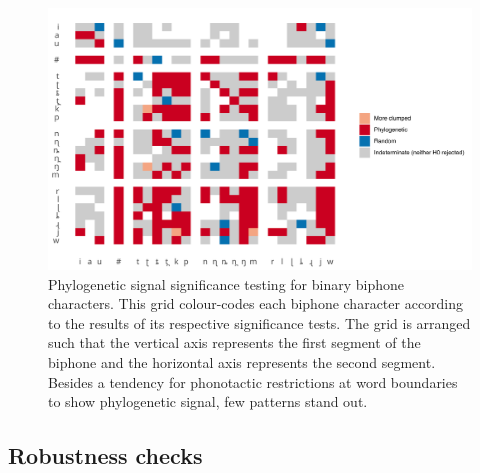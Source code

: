\begin{figure}[tbp]

{\centering \includegraphics[width=0.9\linewidth]{05-phylo-signal/fig/d-sig-swatch} 

}

\caption[Phylogenetic signal significance testing for binary biphone characters]{Phylogenetic signal significance testing for binary biphone characters. This grid colour-codes each biphone character according to the results of its respective significance tests. The grid is arranged such that the vertical axis represents the first segment of the biphone and the horizontal axis represents the second segment. Besides a tendency for phonotactic restrictions at word boundaries to show phylogenetic signal, few patterns stand out. %
}
\label{fig:d-swatch}
\end{figure}

\hypertarget{phy-sig-bin-robustness}{%
\subsection{Robustness checks}\label{phy-sig-bin-robustness}}

